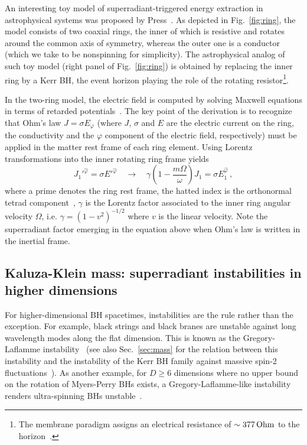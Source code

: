 \documentclass[11pt]{article}
\numberwithin{equation}{section} %
\begin{document}
An interesting toy model of superradiant-triggered energy extraction in astrophysical systems was proposed by Press~\cite{PressRing}. As depicted in Fig.~\ref{fig:ring}, the model consists of two coaxial rings, the inner of which is resistive and rotates around the common axis of symmetry, whereas the outer one is a conductor (which we take to be nonspinning for simplicity). The astrophysical analog of such toy model (right panel of Fig.~\ref{fig:ring}) is obtained by replacing the inner ring by a Kerr BH, the event horizon playing the role of the rotating resistor\footnote{The membrane paradigm assigns an electrical resistance of $\sim 377 \,{\rm Ohm}$ to the horizon~\cite{MembraneParadigm}.}.


In the two-ring model, the electric field is computed by solving Maxwell equations in terms of retarded potentials~\cite{PressRing,Jackson}. The key point of the derivation is to recognize that Ohm's law $J=\sigma E_\varphi$ (where $J$, $\sigma$ and $E$ are the electric current on the ring, the conductivity and the $\varphi$ component of the electric field, respectively) must be applied in the matter rest frame of each ring element. Using Lorentz transformations into the inner rotating ring frame yields
%
\begin{equation}
 {J_1'}^{\hat\varphi}=\sigma {E'}^{\hat \varphi} \quad \to \quad \gamma\left(1-\frac{m\Omega}{\omega}\right)J_1=\sigma E_1^{\hat{\varphi}}\,,
\end{equation}
%
where a prime denotes the ring rest frame, the hatted index is the orthonormal tetrad component~\cite{PressRing}, $\gamma$ is the Lorentz factor associated to the inner ring angular velocity $\Omega$, i.e. $\gamma=(1-v^2)^{-1/2}$ where $v$ is the linear velocity. Note the superradiant factor emerging in the equation above when Ohm's law is written in the inertial frame.

\subsection{Kaluza-Klein mass: superradiant instabilities in higher dimensions}

For higher-dimensional BH spacetimes, instabilities are the rule rather than the exception. For example, black strings and black branes are unstable against long wavelength modes along the flat dimension. This is known as the Gregory-Laflamme instability~\cite{Gregory:1993vy,Gregory:1994bj} (see also Sec.~\ref{sec:mass} for the relation between this instability and the instability of the Kerr BH family against massive spin-2 fluctuations~\cite{Babichev:2013una,Brito:2013wya}). As another example, for $D\geq 6$ dimensions where no upper bound on the rotation of Myers-Perry BHs exists, a Gregory-Laflamme-like instability renders ultra-spinning BHs unstable~\cite{Emparan:2003sy,Dias:2009iu,Dias:2010eu,Dias:2010maa,Dias:2011jg}. 
\end{document}

